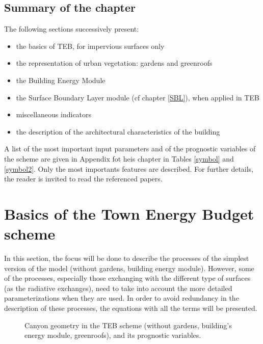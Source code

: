 \subsection{Summary of the chapter}

The following sections successively present: \\

\begin{itemize}
\item the basics of TEB, for impervious surfaces only
\item the representation of urban vegetation: gardens and greenroofs
\item the Building Energy Module
\item the Surface Boundary Layer module (cf chapter \ref{SBL}), when applied in TEB
\item miscellaneous indicators
\item the description of the architectural characteristics of the building
\end{itemize}

A list of the most important input parameters and of the prognostic variables of the scheme are given in Appendix fot heis chapter in Tables \ref{symbol} and \ref{symbol2}. Only the most importants features are described. For further details, the reader is invited to read the referenced papers. \\


\section{Basics of the Town Energy Budget scheme}


In this section, the focus will be done to describe the processes of the simplest version of the model (without gardens, building energy module). However, some of the processes, especially those exchanging with the different type of surfaces (as the radiative exchanges), need to take into account the more detailed parameterizations when they are used. In order to avoid redundancy in the description of these processes, the equations with all the terms will be presented. \\

\begin{figure}[h]
\hspace*{2.cm}
\caption{Canyon geometry in the TEB scheme (without gardens, building's energy module, greenroofs), and its prognostic variables.
\label{TEB2}}
\end{figure}

